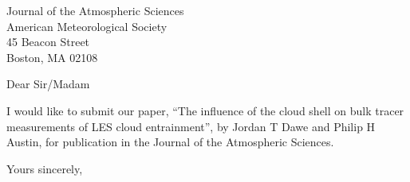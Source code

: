 \documentclass[12pt]{UBCletter}
\date{\today}
\begin{document}
\begin{letter}{%
Journal of the Atmospheric Sciences\\
American Meteorological Society\\
45 Beacon Street\\
Boston, MA 02108}

\opening{Dear Sir/Madam}

I would like to submit our paper, ``The influence of the cloud shell on bulk tracer 
measurements of LES cloud entrainment'', by Jordan T Dawe and Philip H 
Austin, for publication in the Journal of the Atmospheric
Sciences.

\closing{Yours sincerely,}
\end{letter}
\end{document}
